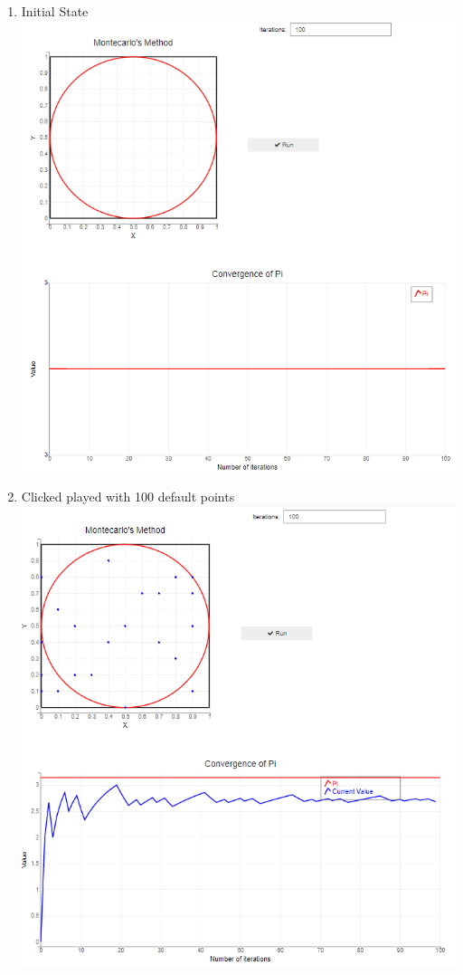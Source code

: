 \begin{enumerate}
    \item Initial State\\
    \includegraphics[scale=0.7]{Include/Images/Thesis/Documentation/Visualizers/Randomness/Example 2/Example 2 - 00 - Initial State.png}
    \item Clicked played with 100 default points\\
    \includegraphics[scale=0.7]{Include/Images/Thesis/Documentation/Visualizers/Randomness/Example 2/Example 2 - 01 - Clicked PLayed.png}

\end{enumerate}

